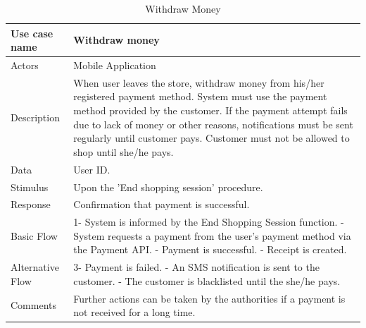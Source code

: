 \documentclass[11pt]{article}
\begin{document}
        \begin{table}[H]
        \begin{centering}
        \begin{tabular}{|p{2.5cm}|p{12cm}|}
        \hline
        Use case name & Withdraw money \\ \hline
        Actors        & Mobile Application \\ \hline
        Description   & When user leaves the store, withdraw money from his/her registered payment method. System must use the payment method provided by the customer. If the payment attempt fails due to lack of money or other reasons, notifications must be sent regularly until customer pays. Customer must not be allowed to shop until she/he pays.    \\ \hline
        Data          & User ID. \\ \hline
        Stimulus      & Upon the 'End shopping session' procedure. \\ \hline
        Response      & Confirmation that payment is successful.  \\ \hline
        Basic Flow    & 
        1- System is informed by the End Shopping Session function. \newline
        2- System requests a payment from the user's payment method via the Payment API. \newline
        3- Payment is successful. \newline
        4- Receipt is created.  \\ \hline
        Alternative
            Flow      & 
        3- Payment is failed. \newline
        4- An SMS notification is sent to the customer. \newline
        5- The customer is blacklisted until the she/he pays. \\ \hline
        Comments      & Further actions can be taken by the authorities if a payment is not received for a long time. \\ \hline
        
        \end{tabular}
        \caption{Withdraw Money}
        \label{tab9}
        \end{centering}
        \end{table}    
        
        
                
\end{document}
